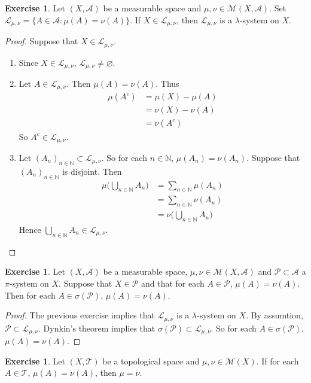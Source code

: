 \documentclass[12pt]{amsart}
\theoremstyle{definition}
\newtheorem{ex}[definition]{Exercise}
\newcommand{\lam}{\lambda}
\newcommand{\sig}{\sigma}
\newcommand{\N}{\mathbb{N}}
\newcommand{\MA}{\mathcal{A}}
\newcommand{\ML}{\mathcal{L}}
\newcommand{\MP}{\mathcal{P}}
\newcommand{\MT}{\mathcal{T}}
\newcommand{\MM}{\mathcal{M}}
\begin{document}
	\begin{ex}
		Let $(X, \MA)$ be a measurable space and $\mu, \nu \in \MM(X, \MA)$. Set $\ML_{\mu,\nu} = \{A \in \MA: \mu(A) = \nu(A)\}$. If $X \in \ML_{\mu, \nu}$, then $\ML_{\mu, \nu}$ is a $\lam$-system on $X$.
	\end{ex}
	
	\begin{proof} Suppose that  $X \in \ML_{\mu, \nu}$.
		\begin{enumerate}
			\item Since $X \in \ML_{\mu, \nu}$, $\ML_{\mu, \nu} \neq \varnothing$.
			\item Let $A \in \ML_{\mu, \nu}$. Then $\mu(A) = \nu(A)$. Thus 
			\begin{align*}
				\mu(A^c) 
				&= \mu(X)-\mu(A) \\
				&= \nu(X) -\nu(A) \\
				&= \nu(A^c)
			\end{align*}
			So $A^c \in \ML_{\mu, \nu}$. 
			\item Let $(A_n)_{n \in \N} \subset \ML_{\mu, \nu}$. So for each $n \in \N$, $\mu(A_n) = \nu(A_n)$.  Suppose that $(A_n)_{n \in \N}$ is disjoint. Then 
			\begin{align*}
				\mu\bigg(\bigcup_{n \in \N} A_n\bigg) 
				&= \sum_{n \in \N} \mu(A_n) \\
				&= \sum_{n \in \N} \nu(A_n) \\
				&= \nu\bigg(\bigcup_{n \in \N} A_n\bigg) 
			\end{align*}
			Hence $\bigcup_{n \in \N} A_n \in \ML_{\mu, \nu}$.
		\end{enumerate}
	\end{proof}
	
	\begin{ex}
		Let $(X, \MA)$ be a measurable space, $\mu, \nu \in \MM(X, \MA)$ and $\MP \subset \MA$ a $\pi$-system on $X$. Suppose that $X \in \MP$ and that for each $A \in \MP$, $\mu(A) = \nu(A)$. Then for each $A \in \sig(\MP)$, $\mu(A) = \nu(A)$.
	\end{ex}
	
	\begin{proof}
		The previous exercise implies that $\ML_{\mu, \nu}$ is a $\lam$-system on $X$. By assumtion, $\MP \subset \ML_{\mu, \nu}$. Dynkin's theorem implies that $\sig(\MP) \subset \ML_{\mu, \nu}$. So for each $A \in \sig(\MP)$, $\mu(A) = \nu(A)$.
	\end{proof}

	\begin{ex}
		Let $(X, \MT)$ be a topological space and $\mu, \nu \in \MM(X)$. If for each $A \in \MT$, $\mu(A) = \nu(A)$, then $\mu = \nu$.
	\end{ex}
\end{document}
